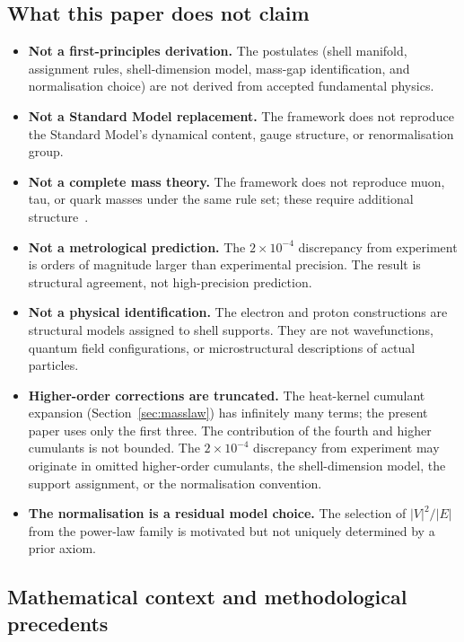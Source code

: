 \documentclass[12pt]{article}
\begin{document}
\subsection{What this paper does not claim}

\begin{itemize}
    \item \textbf{Not a first-principles derivation.} The postulates (shell manifold, assignment rules, shell-dimension model, mass-gap identification, and normalisation choice) are not derived from accepted fundamental physics.
    \item \textbf{Not a Standard Model replacement.} The framework does not reproduce the Standard Model's dynamical content, gauge structure, or renormalisation group.
    \item \textbf{Not a complete mass theory.} The framework does not reproduce muon, tau, or quark masses under the same rule set; these require additional structure~\citep{SmartII}.
    \item \textbf{Not a metrological prediction.} The $2 \times 10^{-4}$ discrepancy from experiment is orders of magnitude larger than experimental precision. The result is structural agreement, not high-precision prediction.
    \item \textbf{Not a physical identification.} The electron and proton constructions are structural models assigned to shell supports. They are not wavefunctions, quantum field configurations, or microstructural descriptions of actual particles.
    \item \textbf{Higher-order corrections are truncated.} The heat-kernel cumulant expansion (Section~\ref{sec:masslaw}) has infinitely many terms; the present paper uses only the first three. The contribution of the fourth and higher cumulants is not bounded. The $2 \times 10^{-4}$ discrepancy from experiment may originate in omitted higher-order cumulants, the shell-dimension model, the support assignment, or the normalisation convention.
    \item \textbf{The normalisation is a residual model choice.} The selection of $|V|^2/|E|$ from the power-law family is motivated but not uniquely determined by a prior axiom.
\end{itemize}

\subsection{Mathematical context and methodological precedents}
\end{document}
